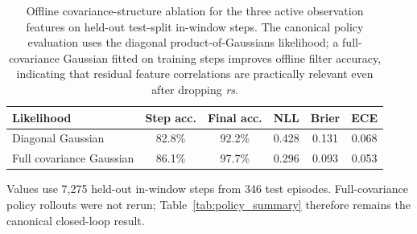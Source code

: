 \begin{table}[htbp]
\centering
\caption{Offline covariance-structure ablation for the three active
  observation features on held-out test-split in-window steps.
  The canonical policy evaluation uses the diagonal product-of-Gaussians
  likelihood; a full-covariance Gaussian fitted on training steps improves
  offline filter accuracy, indicating that residual feature correlations are
  practically relevant even after dropping \emph{rs}.}
\label{tab:covariance_ablation}
\small
\begin{tabular}{lccccc}
\toprule
\textbf{Likelihood} & \textbf{Step acc.} & \textbf{Final acc.} &
\textbf{NLL} & \textbf{Brier} & \textbf{ECE} \\
\midrule
Diagonal Gaussian & 82.8\% & 92.2\% & 0.428 & 0.131 & 0.068 \\
Full covariance Gaussian & 86.1\% & 97.7\% & 0.296 & 0.093 & 0.053 \\
\bottomrule
\end{tabular}
\begin{tablenotes}
\small
\item Values use 7{,}275 held-out in-window steps from 346 test episodes.
  Full-covariance policy rollouts were not rerun; Table~\ref{tab:policy_summary}
  therefore remains the canonical closed-loop result.
\end{tablenotes}
\end{table}
